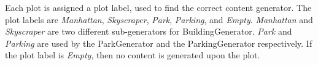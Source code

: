 Each plot is assigned a plot label, used to find the correct content generator.
The plot labels are \textit{Manhattan}, \textit{Skyscraper}, \textit{Park}, \textit{Parking}, and \textit{Empty}.
\textit{Manhattan} and \textit{Skyscraper} are two different sub-generators for BuildingGenerator. 
\textit{Park} and \textit{Parking} are used by the ParkGenerator and the ParkingGenerator respectively.
If the plot label is \textit{Empty}, then no content is generated upon the plot. 
